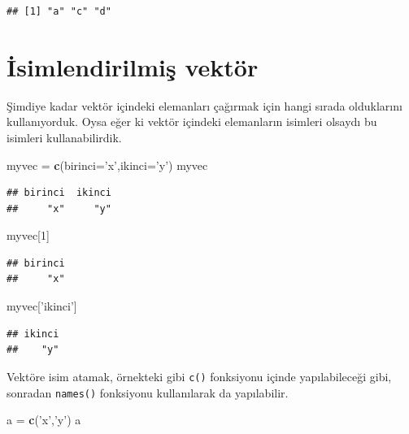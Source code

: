 \documentclass[]{book}
\newenvironment{Shaded}{\begin{snugshade}}{\end{snugshade}}
\newcommand{\DataTypeTok}[1]{\textcolor[rgb]{0.13,0.29,0.53}{#1}}
\newcommand{\DecValTok}[1]{\textcolor[rgb]{0.00,0.00,0.81}{#1}}
\newcommand{\KeywordTok}[1]{\textcolor[rgb]{0.13,0.29,0.53}{\textbf{#1}}}
\newcommand{\NormalTok}[1]{#1}
\newcommand{\StringTok}[1]{\textcolor[rgb]{0.31,0.60,0.02}{#1}}
\begin{document}
\begin{verbatim}
## [1] "a" "c" "d"
\end{verbatim}

\hypertarget{isimlendirilmis-vektor}{%
\section{İsimlendirilmiş vektör}\label{isimlendirilmis-vektor}}

Şimdiye kadar vektör içindeki elemanları çağırmak için hangi sırada
olduklarını kullanıyorduk. Oysa eğer ki vektör içindeki elemanların
isimleri olsaydı bu isimleri kullanabilirdik.

\begin{Shaded}
\begin{Highlighting}[]
\NormalTok{myvec =}\StringTok{ }\KeywordTok{c}\NormalTok{(}\DataTypeTok{birinci=}\StringTok{'x'}\NormalTok{,}\DataTypeTok{ikinci=}\StringTok{'y'}\NormalTok{)}
\NormalTok{myvec}
\end{Highlighting}
\end{Shaded}

\begin{verbatim}
## birinci  ikinci 
##     "x"     "y"
\end{verbatim}

\begin{Shaded}
\begin{Highlighting}[]
\NormalTok{myvec[}\DecValTok{1}\NormalTok{]}
\end{Highlighting}
\end{Shaded}

\begin{verbatim}
## birinci 
##     "x"
\end{verbatim}

\begin{Shaded}
\begin{Highlighting}[]
\NormalTok{myvec[}\StringTok{'ikinci'}\NormalTok{]}
\end{Highlighting}
\end{Shaded}

\begin{verbatim}
## ikinci 
##    "y"
\end{verbatim}

Vektöre isim atamak, örnekteki gibi \texttt{c()} fonksiyonu içinde
yapılabileceği gibi, sonradan \texttt{names()} fonksiyonu kullanılarak
da yapılabilir.

\begin{Shaded}
\begin{Highlighting}[]
\NormalTok{a =}\StringTok{ }\KeywordTok{c}\NormalTok{(}\StringTok{'x'}\NormalTok{,}\StringTok{'y'}\NormalTok{)}
\NormalTok{a}
\end{Highlighting}
\end{Shaded}
\end{document}
